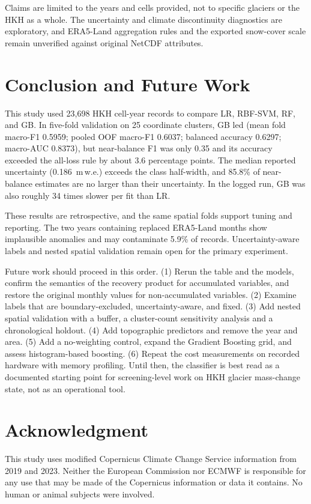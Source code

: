 \documentclass[conference]{IEEEtran}
\newcommand{\mwe}{m\,w.e.}
\begin{document}
Claims are limited to the years and cells provided, not to specific glaciers or the HKH as a whole. The uncertainty and climate discontinuity diagnostics are exploratory, and ERA5-Land aggregation rules and the exported snow-cover scale remain unverified against original NetCDF attributes.

\section{Conclusion and Future Work}\label{sec:conclusion}
This study used 23,698 HKH cell-year records to compare LR, RBF-SVM, RF, and GB. In five-fold validation on 25 coordinate clusters, GB led (mean fold macro-F1 0.5959; pooled OOF macro-F1 0.6037; balanced accuracy 0.6297; macro-AUC 0.8373), but near-balance F1 was only 0.35 and its accuracy exceeded the all-loss rule by about 3.6 percentage points. The median reported uncertainty (0.186~\mwe) exceeds the class half-width, and 85.8\% of near-balance estimates are no larger than their uncertainty. In the logged run, GB was also roughly 34 times slower per fit than LR.

These results are retrospective, and the same spatial folds support tuning and reporting. The two years containing replaced ERA5-Land months show implausible anomalies and may contaminate 5.9\% of records. Uncertainty-aware labels and nested spatial validation remain open for the primary experiment.

Future work should proceed in this order. (1) Rerun the table and the models, confirm the semantics of the recovery product for accumulated variables, and restore the original monthly values for non-accumulated variables. (2) Examine labels that are boundary-excluded, uncertainty-aware, and fixed. (3) Add nested spatial validation with a buffer, a cluster-count sensitivity analysis and a chronological holdout. (4) Add topographic predictors and remove the year and area. (5) Add a no-weighting control, expand the Gradient Boosting grid, and assess histogram-based boosting. (6) Repeat the cost measurements on recorded hardware with memory profiling. Until then, the classifier is best read as a documented starting point for screening-level work on HKH glacier mass-change state, not as an operational tool.

\section*{Acknowledgment}
This study uses modified Copernicus Climate Change Service information from 2019 and 2023. Neither the European Commission nor ECMWF is responsible for any use that may be made of the Copernicus information or data it contains. No human or animal subjects were involved.
\end{document}
